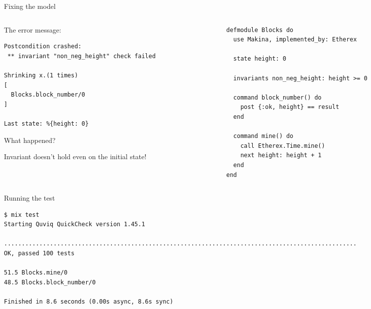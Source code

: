 \documentclass[aspectratio=169, 10pt]{beamer}
\begin{document}
\begin{frame}[label={sec:org2cc0975},fragile]{Fixing the model}
 \begin{columns}
\begin{column}{0.48\columnwidth}
The error message:

\lstset{language=shell,label= ,caption= ,captionpos=b,numbers=none,style=display}
\begin{lstlisting}
Postcondition crashed:
 ** invariant "non_neg_height" check failed

Shrinking x.(1 times)
[
  Blocks.block_number/0
]

Last state: %{height: 0}
\end{lstlisting}

What happened?

\vspace{10pt}

Invariant doesn't hold even on the initial state!
\end{column}

\begin{column}{0.48\columnwidth}
\lstset{language=elixir,label= ,caption= ,captionpos=b,numbers=none,style=display}
\begin{lstlisting}
defmodule Blocks do
  use Makina, implemented_by: Etherex

  state height: 0

  invariants non_neg_height: height >= 0

  command block_number() do
    post {:ok, height} == result
  end

  command mine() do
    call Etherex.Time.mine()
    next height: height + 1
  end
end
\end{lstlisting}
\end{column}
\end{columns}
\end{frame}



\begin{frame}[label={sec:orgc784ea9},fragile]{Running the test}
 \lstset{language=shell,label= ,caption= ,captionpos=b,numbers=none,style=display}
\begin{lstlisting}
$ mix test
Starting Quviq QuickCheck version 1.45.1

....................................................................................................
OK, passed 100 tests

51.5 Blocks.mine/0
48.5 Blocks.block_number/0

Finished in 8.6 seconds (0.00s async, 8.6s sync)
\end{lstlisting}
\end{frame}
\end{document}
